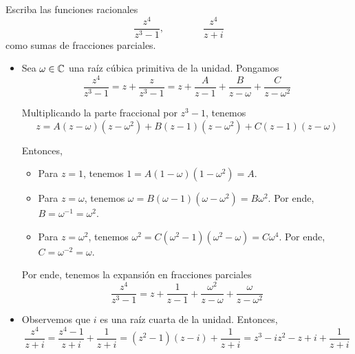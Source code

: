 \begin{exercise}
Escriba las funciones racionales
$$\frac {z^4} {z^3 - 1}, \qquad \qquad \frac {z^4} {z+i}$$
como sumas de fracciones parciales.
\end{exercise}

\begin{solution}
\leavevmode
\begin{itemize}
    \item Sea $\omega \in \mathbb C$ una raíz cúbica primitiva de la unidad. Pongamos
    $$
    \frac {z^4} {z^3 - 1}
        = z + \frac z {z^3 - 1}
        = z + \frac A {z - 1} + \frac B {z - \omega} + \frac C {z - \omega^2}
    $$
    
    Multiplicando la parte fraccional por $z^3 - 1$, tenemos
    $$z = A (z - \omega) (z - \omega^2) + B (z - 1) (z - \omega^2) + C (z - 1) (z - \omega)$$
    
    Entonces,
    \begin{itemize}
        \item Para $z = 1$, tenemos $1 = A (1 - \omega)(1 - \omega^2) = A$.
        \item Para $z = \omega$, tenemos $\omega = B (\omega - 1) (\omega - \omega^2) = B \omega^2$. Por ende, $B = \omega^{-1} = \omega^2$.
        \item Para $z = \omega^2$, tenemos $\omega^2 = C (\omega^2 - 1) (\omega^2 - \omega) = C \omega^4$. Por ende, $C = \omega^{-2} = \omega$.
    \end{itemize}
    
    Por ende, tenemos la expansión en fracciones parciales
    $$\frac {z^4} {z^3 - 1} = z + \frac 1 {z - 1} + \frac {\omega^2} {z - \omega} + \frac \omega {z - \omega^2}$$
    
    \item Observemos que $i$ es una raíz cuarta de la unidad. Entonces,
    $$
    \frac {z^4} {z+i}
        = \frac {z^4 - 1} {z + i} + \frac 1 {z + i}
        = (z^2 - 1) (z - i) + \frac 1 {z + i}
        = z^3 - iz^2 - z + i + \frac 1 {z + i}
    $$
\end{itemize}
\end{solution}
